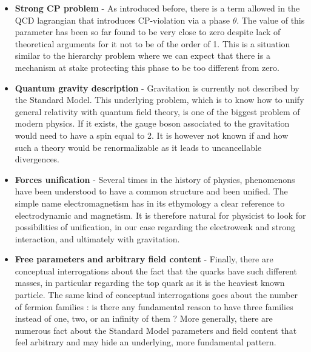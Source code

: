     \begin{itemize}
        \item \textbf{Strong CP problem} - As introduced before, there is a term allowed in
            the QCD lagrangian that introduces CP-violation via a phase $\theta$. The value
            of this parameter has been so far found to be very close to zero despite
            lack of theoretical arguments for it not to be of the order of 1. This is a situation
            similar to the hierarchy problem where we can expect that there is a mechanism
            at stake protecting this phase to be too different from zero.
        \item \textbf{Quantum gravity description} - Gravitation is currently not described
            by the Standard Model. This underlying problem, which is to know how to unify general
            relativity with quantum field theory, is one of the biggest problem of modern
            physics. If it exists, the gauge boson associated to the gravitation would
            need to have a spin equal to 2. It is however not known if and how such
            a theory would be renormalizable as it leads to uncancellable divergences.
        \item \textbf{Forces unification} - Several times in the history of physics,
            phenomenons have been understood to have a common structure and
            been unified. The simple name electromagnetism has in its ethymology a clear
            reference to electrodynamic and magnetism. It is therefore natural for physicist
            to look for possibilities of unification, in our case regarding the electroweak
            and strong interaction, and ultimately with gravitation. 

        \item \textbf{Free parameters and arbitrary field content} -
            Finally, there are conceptual interrogations about the fact that the quarks have
            such different masses, in particular regarding the top quark as it is the
            heaviest known particle. The same kind of conceptual interrogations goes about
            the number of fermion families : is there any fundamental reason to have three
            families instead of one, two, or an infinity of them ? More generally, there
            are numerous fact about the Standard Model parameters and field content that
            feel arbitrary and may hide an underlying, more fundamental pattern.
    \end{itemize}


